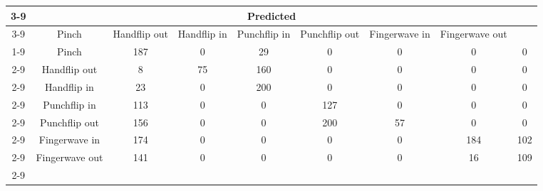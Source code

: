 \documentclass{standalone}
\begin{document}
 
 \begin{tabular}{|c |c |c |c |c |c |c |c |c |}
\cline{3-9}\multicolumn{2}{c|}{} & \multicolumn{7}{c|}{Predicted} \\ 
\cline{3-9} \multicolumn{2}{c |}{ } & Pinch & Handflip out & Handflip in & Punchflip in & Punchflip out & Fingerwave in & Fingerwave out\\ 
\cline{1-9}\multirow{7}{*}{\rotatebox[origin=c]{90}{Actual}} & Pinch & 187 & 0 & 29 & 0 & 0 & 0 & 0\\ 
 \cline{2-9} & Handflip out & 8 & 75 & 160 & 0 & 0 & 0 & 0\\ 
 \cline{2-9} & Handflip in & 23 & 0 & 200 & 0 & 0 & 0 & 0\\ 
 \cline{2-9} & Punchflip in & 113 & 0 & 0 & 127 & 0 & 0 & 0\\ 
 \cline{2-9} & Punchflip out & 156 & 0 & 0 & 200 & 57 & 0 & 0\\ 
 \cline{2-9} & Fingerwave in & 174 & 0 & 0 & 0 & 0 & 184 & 102\\ 
 \cline{2-9} & Fingerwave out & 141 & 0 & 0 & 0 & 0 & 16 & 109\\ 
 \cline{2-9}\hline \end{tabular}
 
\end{document}
